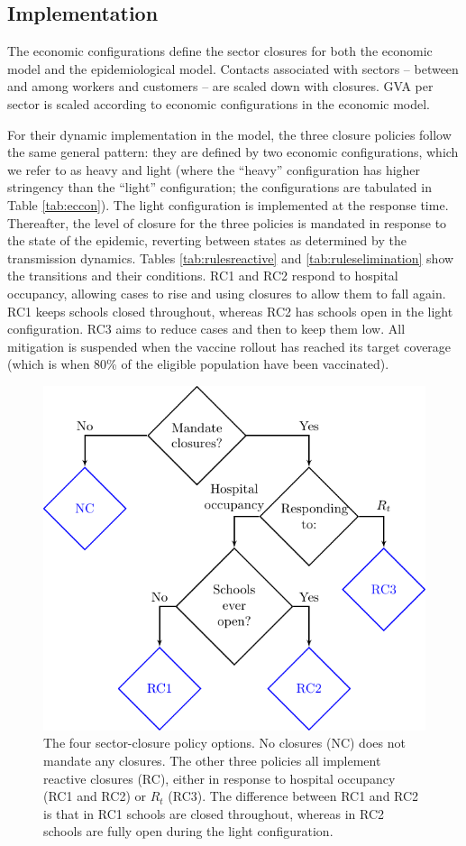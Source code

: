 \documentclass[
]{article}
\begin{document}
\subsection{Implementation}\label{implementation}

The economic configurations define the sector closures for both the economic model and the epidemiological model. Contacts associated with sectors -- between and among workers and customers -- are scaled down with closures. GVA per sector is scaled according to economic configurations in the economic model.

For their dynamic implementation in the model, the three closure policies follow the same general pattern: they are defined by two economic configurations, which we refer to as heavy and light (where the ``heavy'' configuration has higher stringency than the ``light'' configuration; the configurations are tabulated in Table \ref{tab:eccon}). The light configuration is implemented at the response time. Thereafter, the level of closure for the three policies is mandated in response to the state of the epidemic, reverting between states as determined by the transmission dynamics. Tables \ref{tab:rulesreactive} and \ref{tab:ruleselimination} show the transitions and their conditions. RC1 and RC2 respond to hospital occupancy, allowing cases to rise and using closures to allow them to fall again. RC1 keeps schools closed throughout, whereas RC2 has schools open in the light configuration. RC3 aims to reduce cases and then to keep them low. All mitigation is suspended when the vaccine rollout has reached its target coverage (which is when 80\% of the eligible population have been vaccinated).

\begin{figure}
\includegraphics[width=0.5\linewidth]{README_files/figure-latex/policies-1} \caption{The four sector-closure policy options. No closures (NC) does not mandate any closures. The other three policies all implement reactive closures (RC), either in response to hospital occupancy (RC1 and RC2) or $R_t$ (RC3). The difference between RC1 and RC2 is that in RC1 schools are closed throughout, whereas in RC2 schools are fully open during the light configuration.}\label{fig:policies}
\end{figure}
\end{document}
